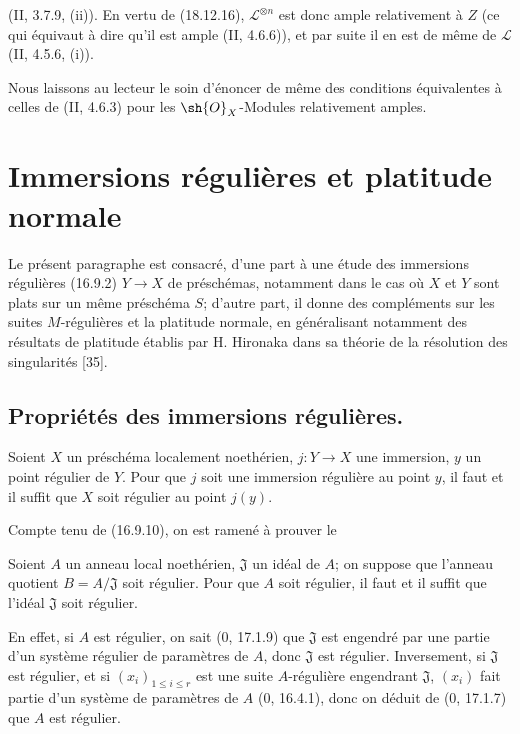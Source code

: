 
(II, 3.7.9, (ii)). En vertu de (18.12.16), $\mathscr L^{\otimes n}$ est donc ample relativement à $Z$ (ce qui équivaut à dire qu'il est ample (II, 4.6.6)), et par suite il en est de même de $\mathscr L$ (II, 4.5.6, (i)).

Nous laissons au lecteur le soin d'énoncer de même des conditions équivalentes à celles de (II, 4.6.3) pour les $\sh{O}_X$-Modules relativement amples.

\section{Immersions régulières et platitude normale}
\label{section:IV.19}

Le présent paragraphe est consacré, d'une part à une étude des immersions régulières (16.9.2) $Y\to X$ de préschémas, notamment dans le cas où $X$ et $Y$ sont plats sur un même préschéma $S$; d'autre part, il donne des compléments sur les suites $M$-régulières et la platitude normale, en généralisant notamment des résultats de platitude établis par H. Hironaka dans sa théorie de la résolution des singularités [35].

\subsection{Propriétés des immersions régulières.}
\label{subsection:IV.19.1}

\begin{proposition}[19.1.1]
\label{IV.19.1.1}
Soient $X$ un préschéma localement noethérien, $j:Y\to X$ une immersion, $y$ un point régulier de $Y$. Pour que $j$ soit une immersion régulière au point $y$, il faut et il suffit que $X$ soit régulier au point $j(y)$.
\end{proposition}

Compte tenu de (16.9.10), on est ramené à prouver le

\begin{corollary}[19.1.2]
\label{IV.19.1.2}
Soient $A$ un anneau local noethérien, $\mathfrak J$ un idéal de $A$; on suppose que l'anneau quotient $B=A/\mathfrak J$ soit régulier. Pour que $A$ soit régulier, il faut et il suffit que l'idéal $\mathfrak J$ soit régulier.
\end{corollary}

En effet, si $A$ est régulier, on sait ($0$, 17.1.9) que $\mathfrak J$ est engendré par une partie d'un système régulier de paramètres de $A$, donc $\mathfrak J$ est régulier. Inversement, si $\mathfrak J$ est régulier, et si $(x_i)_{1\leq i\leq r}$ est une suite $A$-régulière engendrant $\mathfrak J$, $(x_i)$ fait partie d'un système de paramètres de $A$ ($0$, 16.4.1), donc on déduit de ($0$, 17.1.7) que $A$ est régulier.

